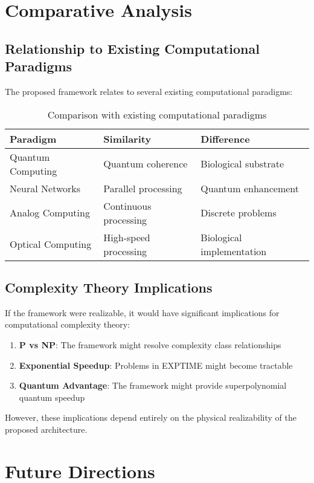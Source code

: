\documentclass[12pt,a4paper]{article}
\theoremstyle{definition}
\begin{document}
{\section{Comparative Analysis}

\subsection{Relationship to Existing Computational Paradigms}

The proposed framework relates to several existing computational paradigms:

\begin{table}[h]
\centering
\begin{tabular}{|l|l|l|}
\hline
Paradigm & Similarity & Difference \\
\hline
Quantum Computing & Quantum coherence & Biological substrate \\
Neural Networks & Parallel processing & Quantum enhancement \\
Analog Computing & Continuous processing & Discrete problems \\
Optical Computing & High-speed processing & Biological implementation \\
\hline
\end{tabular}
\caption{Comparison with existing computational paradigms}
\end{table}

\subsection{Complexity Theory Implications}

If the framework were realizable, it would have significant implications for computational complexity theory:

\begin{enumerate}
\item \textbf{P vs NP}: The framework might resolve complexity class relationships
\item \textbf{Exponential Speedup}: Problems in EXPTIME might become tractable
\item \textbf{Quantum Advantage}: The framework might provide superpolynomial quantum speedup
\end{enumerate}

However, these implications depend entirely on the physical realizability of the proposed architecture.

\section{Future Directions}

}
\end{document}
